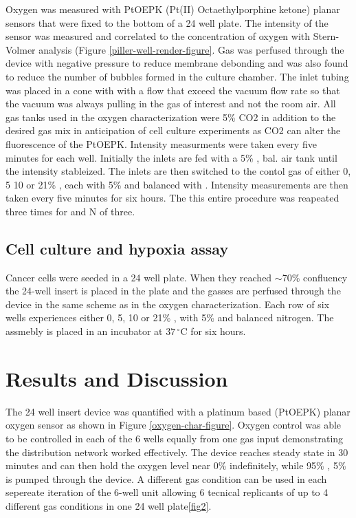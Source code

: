 Oxygen was measured with PtOEPK (Pt(II) Octaethylporphine ketone) planar sensors that were fixed to the bottom of a 24 well plate. 
The intensity of the sensor was measured and correlated to the concentration of oxygen with Stern-Volmer analysis (Figure \ref{piller-well-render-figure}.
Gas was perfused through the device with negative pressure to reduce membrane debonding and was also found to reduce the number of bubbles formed in the culture chamber.
The inlet tubing was placed in a cone with with a flow that exceed the vacuum flow rate so that the vacuum was always pulling in the gas of interest and not the room air.
All gas tanks used in the oxygen characterization were 5\% CO2 in addition to the desired gas mix in anticipation of cell culture experiments as CO2 can alter the fluorescence of the PtOEPK.
Intensity measurments were taken every five minutes for each well.
Initially the inlets are fed with a 5\% , bal. air tank until the intensity stableized.
The inlets are then switched to the contol gas of either 0, 5 10 or 21\% , each with 5\%  and balanced with .
Intensity measurements are then taken every five minutes for six hours.
The this entire procedure was reapeated three times for and N of three. 

\subsection*{Cell culture and hypoxia assay}

Cancer cells were seeded in a 24 well plate.
When they reached $\sim$70\% confluency the 24-well insert is placed in the plate and the gasses are perfused through the device in the same scheme as in the oxygen characterization.
Each row of six wells experiences either 0, 5, 10 or 21\% , with 5\%  and balanced nitrogen.
The assmebly is placed in an incubator at $37\,^{\circ}\mathrm{C}$ for six hours. 


\section*{Results and Discussion}


The 24 well insert device was quantified with a platinum based (PtOEPK) planar oxygen sensor as shown in Figure \ref{oxygen-char-figure}.
Oxygen control was able to be controlled in each of the 6 wells equally from one gas input demonstrating the distribution network worked effectively.
The device reaches steady state in 30 minutes and can then hold the oxygen level near 0\%  indefinitely, while 95\% , 5\%  is pumped through the device. 
A different gas condition can be used in each sepereate iteration of the 6-well unit allowing 6 tecnical replicants of up to 4 different gas conditions in one 24 well plate\ref{fig2}.


